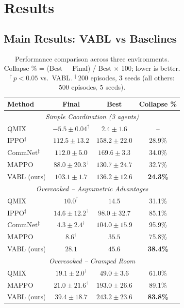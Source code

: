 \documentclass{article}
\theoremstyle{plain}
\theoremstyle{definition}
\theoremstyle{remark}
\begin{document}
\section{Results}
\label{sec:results}

\subsection{Main Results: VABL vs Baselines}

\begin{table}[tb]
\centering
\caption{Performance comparison across three environments. Collapse \% = (Best $-$ Final) / Best $\times$ 100; lower is better. $^\dagger$\,$p < 0.05$ vs.\ VABL. $^\ddagger$\,200 episodes, 3 seeds (all others: 500 episodes, 5 seeds).}
\label{tab:main_results}
\begingroup
\setlength{\tabcolsep}{3pt}
\renewcommand{\arraystretch}{0.95}
\small
\begin{tabular}{lccc}
\toprule
\textbf{Method} & \textbf{Final} & \textbf{Best} & \textbf{Collapse \%} \\
\midrule
\multicolumn{4}{c}{\textit{Simple Coordination (3 agents)}} \\
\midrule
QMIX & $-5.5 \pm 0.04^\dagger$ & $2.4 \pm 1.6$ & -- \\
IPPO$^\ddagger$ & $112.5 \pm 13.2$ & $158.2 \pm 22.0$ & 28.9\% \\
CommNet$^\ddagger$ & $112.0 \pm 5.0$ & $169.6 \pm 3.3$ & 34.0\% \\
MAPPO & $88.0 \pm 20.3^\dagger$ & $130.7 \pm 24.7$ & 32.7\% \\
VABL (ours) & $\mathbf{103.1 \pm 1.7}$ & $136.2 \pm 12.6$ & \textbf{24.3\%} \\
\midrule
\multicolumn{4}{c}{\textit{Overcooked -- Asymmetric Advantages}} \\
\midrule
QMIX & $10.0^\dagger$ & $14.5$ & 31.1\% \\
IPPO$^\ddagger$ & $14.6 \pm 12.2^\dagger$ & $98.0 \pm 32.7$ & 85.1\% \\
CommNet$^\ddagger$ & $4.3 \pm 2.4^\dagger$ & $104.0 \pm 15.9$ & 95.9\% \\
MAPPO & $8.6^\dagger$ & $35.5$ & 75.8\% \\
VABL (ours) & $\mathbf{28.1}$ & $\mathbf{45.6}$ & \textbf{38.4\%} \\
\midrule
\multicolumn{4}{c}{\textit{Overcooked -- Cramped Room}} \\
\midrule
QMIX & $19.1 \pm 2.0^\dagger$ & $49.0 \pm 3.6$ & 61.0\% \\
MAPPO & $21.0 \pm 21.6^\dagger$ & $193.0 \pm 26.6$ & 89.1\% \\
VABL (ours) & $\mathbf{39.4 \pm 18.7}$ & $\mathbf{243.2 \pm 23.6}$ & \textbf{83.8\%} \\
\bottomrule
\end{tabular}
\endgroup
\end{table}
\end{document}
